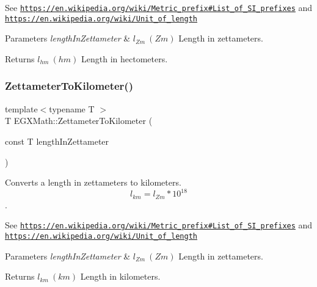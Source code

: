 See \href{https://en.wikipedia.org/wiki/Metric_prefix#List_of_SI_prefixes}{\tt https\+://en.\+wikipedia.\+org/wiki/\+Metric\+\_\+prefix\#\+List\+\_\+of\+\_\+\+S\+I\+\_\+prefixes} and \href{https://en.wikipedia.org/wiki/Unit_of_length}{\tt https\+://en.\+wikipedia.\+org/wiki/\+Unit\+\_\+of\+\_\+length} 
\begin{DoxyParams}{Parameters}
{\em length\+In\+Zettameter} & $ l_{Zm}\ (Zm)$ Length in zettameters. \\
\hline
\end{DoxyParams}
\begin{DoxyReturn}{Returns}
$ l_{hm}\ (hm)$ Length in hectometers. 
\end{DoxyReturn}
\mbox{\label{group___e_g_x_math-_conversions-_length_conversions-_s_i-_zettameter-_s_i_ga99d03473393cdeeeca462cdd0928c9d9}} 
\subsubsection{\texorpdfstring{Zettameter\+To\+Kilometer()}{ZettameterToKilometer()}}
{\footnotesize\ttfamily template$<$typename T $>$ \\
T E\+G\+X\+Math\+::\+Zettameter\+To\+Kilometer (\begin{DoxyParamCaption}\item[{const T}]{length\+In\+Zettameter }\end{DoxyParamCaption})}



Converts a length in zettameters to kilometers. \[ l_{km}=l_{Zm} * 10^{18} \]. 

See \href{https://en.wikipedia.org/wiki/Metric_prefix#List_of_SI_prefixes}{\tt https\+://en.\+wikipedia.\+org/wiki/\+Metric\+\_\+prefix\#\+List\+\_\+of\+\_\+\+S\+I\+\_\+prefixes} and \href{https://en.wikipedia.org/wiki/Unit_of_length}{\tt https\+://en.\+wikipedia.\+org/wiki/\+Unit\+\_\+of\+\_\+length} 
\begin{DoxyParams}{Parameters}
{\em length\+In\+Zettameter} & $ l_{Zm}\ (Zm)$ Length in zettameters. \\
\hline
\end{DoxyParams}
\begin{DoxyReturn}{Returns}
$ l_{km}\ (km)$ Length in kilometers. 
\end{DoxyReturn}
\mbox{\label{group___e_g_x_math-_conversions-_length_conversions-_s_i-_zettameter-_s_i_gaf29478b073f568afbf9c70b3c2eb94e4}} 
